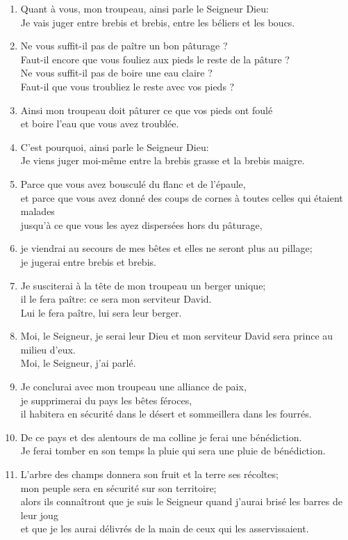 \documentclass[12pt,a4paper,titlepage]{article}
\def \pslabelsep{0.2em} %
\def \psleftmargin{0em} %
\begin{document}
\begin{enumerate}[leftmargin=\psleftmargin, labelsep = \pslabelsep, label={\arabic*}, font=\color{\pscolor}\small\textsuperscript, parsep=0em, itemsep=0em, topsep=0em ]
 \item Quant à vous, mon troupeau, ainsi parle le Seigneur Dieu: \\ Je vais juger entre brebis et brebis, entre les béliers et les boucs.
\item Ne vous suffit-il pas de paître un bon pâturage ? \\ Faut-il encore que vous fouliez aux pieds le reste de la pâture ? \\ Ne vous suffit-il pas de boire une eau claire ? \\ Faut-il que vous troubliez le reste avec vos pieds ?
\item Ainsi mon troupeau doit pâturer ce que vos pieds ont foulé \\ et boire l’eau que vous avez troublée. \parSpace
\item C’est pourquoi, ainsi parle le Seigneur Dieu: \\ Je viens juger moi-même entre la brebis grasse et la brebis maigre.
\item Parce que vous avez bousculé du flanc et de l’épaule, \\ et parce que vous avez donné des coups de cornes à toutes celles qui étaient malades \\ jusqu’à ce que vous les ayez dispersées hors du pâturage,
\item je viendrai au secours de mes bêtes et elles ne seront plus au pillage; \\ je jugerai entre brebis et brebis.
\item Je susciterai à la tête de mon troupeau un berger unique; \\ il le fera paître: ce sera mon serviteur David. \\ Lui le fera paître, lui sera leur berger.
\item Moi, le Seigneur, je serai leur Dieu et mon serviteur David sera prince au milieu d’eux. \\ Moi, le Seigneur, j’ai parlé.
\item Je conclurai avec mon troupeau une alliance de paix, \\ je supprimerai du pays les bêtes féroces, \\ il habitera en sécurité dans le désert et sommeillera dans les fourrés.
\item De ce pays et des alentours de ma colline je ferai une bénédiction. \\ Je ferai tomber en son temps la pluie qui sera une pluie de bénédiction.
\item L’arbre des champs donnera son fruit et la terre ses récoltes; \\ mon peuple sera en sécurité sur son territoire; \\ alors ils connaîtront que je suis le Seigneur quand j’aurai brisé les barres de leur joug \\ et que je les aurai délivrés de la main de ceux qui les asservissaient.

\end{enumerate}
\end{document}
